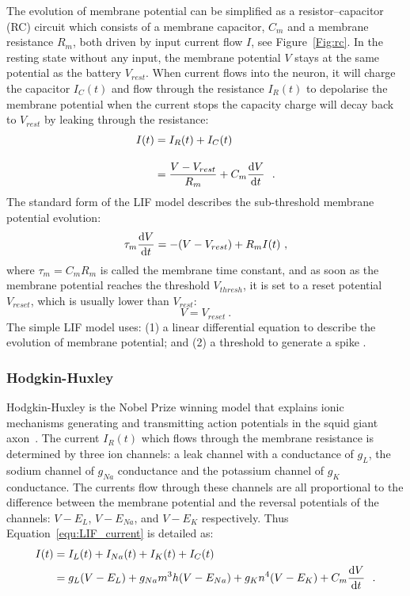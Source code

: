 The evolution of membrane potential can be simplified as a resistor–capacitor (RC) circuit which consists of a membrane capacitor, $C_m$ and a membrane resistance $R_m$, both driven by input current flow $I$, see Figure~\ref{Fig:rc}.
In the resting state without any input, the membrane potential $V$ stays at the same potential as the battery $V_{rest}$.
When current flows into the neuron, it will charge the capacitor $I_C(t)$ and flow through the resistance $I_R(t)$ to depolarise the membrane potential when the current stops the capacity charge will decay back to $V_{rest}$ by leaking through the resistance:
\begin{equation}
\begin{aligned}
	I(t) &= I_R(t) + I_C(t) \\[10pt]
	&= \dfrac{V-V_{rest}}{R_m} + C_m \dfrac{\mathrm{d} V}{\mathrm{d} t}~~.
\end{aligned}
\label{equ:LIF_current}
\end{equation}
The standard form of the LIF model describes the sub-threshold membrane potential evolution:
\begin{equation}
	\tau_m \dfrac{\mathrm{d} V}{\mathrm{d} t} = -(V-V_{rest}) + R_m I(t)~,
\end{equation}
where $\tau_m = C_m R_m$ is called the membrane time constant, and as soon as the membrane potential reaches the threshold $V_{thresh}$, it is set to a reset potential $V_{reset}$, which is usually lower than $V_{rest}$: 
\begin{equation}
V = V_{reset}~.
\end{equation}
The simple LIF model uses: (1) a linear differential equation to describe the evolution of membrane potential;
and (2) a threshold to generate a spike .

\subsubsection{Hodgkin-Huxley}
Hodgkin-Huxley is the Nobel Prize winning model that explains ionic mechanisms generating and transmitting action potentials in the squid giant axon~\cite{hodgkin1939action}.
The current $I_R(t)$ which flows through the membrane resistance is determined by three ion channels: a leak channel with a conductance of $g_L$, the sodium channel of $g_{Na}$ conductance and the potassium channel of  $g_{K}$ conductance.
The currents flow through these channels are all proportional to the difference between the membrane potential and the reversal potentials of the channels: $V-E_L$, $V-E_{Na}$, and $V-E_{K}$ respectively.
Thus Equation~\ref{equ:LIF_current} is detailed as:
\begin{equation}
\begin{aligned}
I(t) &= I_L(t) + I_{Na}(t) + I_{K}(t)+ I_C(t) \\
&= g_L(V-E_L) + g_{Na}m^3h(V-E_{Na}) + g_{K}n^4(V-E_{K})  + C_m \dfrac{\mathrm{d} V}{\mathrm{d} t}~~.
\end{aligned}
\label{equ:HH_current}
\end{equation}
 
